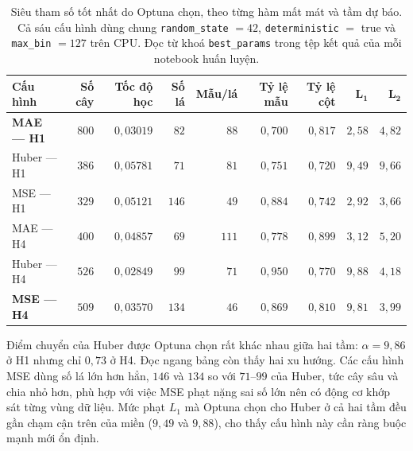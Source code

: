 \documentclass[12pt, a4paper]{report}
\begin{document}
\begin{table}[htbp]
\centering
\caption{Siêu tham số tốt nhất do Optuna chọn, theo từng hàm mất mát và tầm dự báo. Cả sáu cấu
hình dùng chung \texttt{random\_state} $=42$, \texttt{deterministic} $=$ true và
\texttt{max\_bin} $=127$ trên CPU. Đọc từ khoá \texttt{best\_params} trong tệp kết quả của mỗi
notebook huấn luyện.}
\label{tab:sieu_tham_so}
\scriptsize
\begin{tabular}{l r r r r r r r r}
\toprule
\textbf{Cấu hình} & \textbf{Số cây} & \textbf{Tốc độ học} & \textbf{Số lá} &
\textbf{Mẫu/lá} & \textbf{Tỷ lệ mẫu} & \textbf{Tỷ lệ cột} & $\boldsymbol{L_1}$ & $\boldsymbol{L_2}$ \\
\midrule
\textbf{MAE --- H1}  & $800$ & $0{,}03019$ & $82$  & $88$ & $0{,}700$ & $0{,}817$ & $2{,}58$ & $4{,}82$ \\
Huber --- H1         & $386$ & $0{,}05781$ & $71$  & $81$ & $0{,}751$ & $0{,}720$ & $9{,}49$ & $9{,}66$ \\
MSE --- H1           & $329$ & $0{,}05121$ & $146$ & $49$ & $0{,}884$ & $0{,}742$ & $2{,}92$ & $3{,}66$ \\
\addlinespace
MAE --- H4           & $400$ & $0{,}04857$ & $69$  & $111$ & $0{,}778$ & $0{,}899$ & $3{,}12$ & $5{,}20$ \\
Huber --- H4         & $526$ & $0{,}02849$ & $99$  & $71$ & $0{,}950$ & $0{,}770$ & $9{,}88$ & $4{,}18$ \\
\textbf{MSE --- H4}  & $509$ & $0{,}03570$ & $134$ & $46$ & $0{,}869$ & $0{,}810$ & $9{,}81$ & $3{,}99$ \\
\bottomrule
\end{tabular}
\caption[Siêu tham số tốt nhất do Optuna chọn, theo từng hàm mất mát và tầm dự báo]{Siêu tham số tốt nhất do Optuna chọn, theo từng hàm mất mát và tầm dự báo. Cả sáu cấu
hình dùng chung \texttt{random\_state} $=42$, \texttt{deterministic} $=$ true và
\texttt{max\_bin} $=127$ trên CPU. Đọc từ khoá \texttt{best\_params} trong tệp kết quả của mỗi
notebook huấn luyện.}
\label{tab:sieu_tham_so}
\end{table}

Điểm chuyển của Huber được Optuna chọn rất khác nhau giữa hai tầm: $\alpha = 9{,}86$ ở H1 nhưng
chỉ $0{,}73$ ở H4. Đọc ngang bảng còn thấy hai xu hướng. Các cấu hình MSE dùng số lá lớn hơn
hẳn, $146$ và $134$ so với $71$--$99$ của Huber, tức cây sâu và chia nhỏ hơn, phù hợp với
việc MSE phạt nặng sai số lớn nên có động cơ khớp sát từng vùng dữ liệu. Mức phạt $L_1$ mà
Optuna chọn cho Huber ở cả hai tầm đều gần chạm cận trên của miền ($9{,}49$ và $9{,}88$), cho
thấy cấu hình này cần ràng buộc mạnh mới ổn định.
\end{document}
